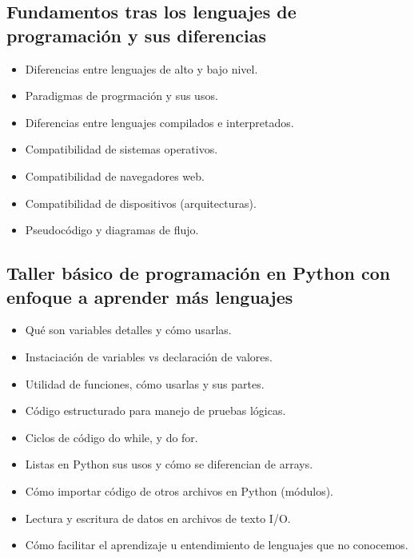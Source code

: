 ﻿\documentclass[letterpaper]{article}
\begin{document}
\subsection{Fundamentos tras los lenguajes de programación y sus diferencias}
\begin{itemize}
    \item Diferencias entre lenguajes de alto y bajo nivel.
    \item Paradigmas de progrmación y sus usos.
    \item Diferencias entre lenguajes compilados e interpretados.
    \item Compatibilidad de sistemas operativos.
    \item Compatibilidad de navegadores web.
    \item Compatibilidad de dispositivos (arquitecturas).
    \item Pseudocódigo y diagramas de flujo.
\end{itemize}
\subsection{Taller básico de programación en Python con enfoque a aprender más lenguajes}
\begin{itemize}
    \item Qué son variables detalles y cómo usarlas.
    \item Instaciación de variables vs declaración de valores.
    \item Utilidad de funciones, cómo usarlas y sus partes.
    \item Código estructurado para manejo de pruebas lógicas.
    \item Ciclos de código do while, y do for.
    \item Listas en Python sus usos y cómo se diferencian de arrays.
    \item Cómo importar código de otros archivos en Python (módulos).
    \item Lectura y escritura de datos en archivos de texto I/O.
    \item Cómo facilitar el aprendizaje u entendimiento de lenguajes que no conocemos.
\end{itemize}

\clearpage
\end{document}
